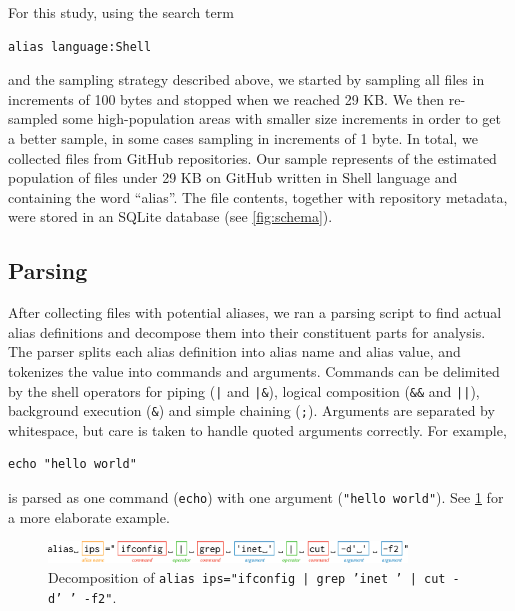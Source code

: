 For this study, using the search term
\begin{verbatim}
alias language:Shell
\end{verbatim}
and the sampling strategy described above, we started by sampling all files in increments of 100 bytes and stopped when we reached 29 KB.
We then re-sampled some high-population areas with smaller size increments in order to get a better sample, in some cases sampling in increments of 1 byte.
In total, we collected  files from  GitHub repositories.
Our sample represents  of the estimated population of  files under 29 KB on GitHub written in Shell language and containing the word ``alias''.
The file contents, together with repository metadata, were stored in an SQLite database (see \cref{fig:schema}).


\subsection{Parsing}

After collecting files with potential aliases, we ran a parsing script to find actual alias definitions and decompose them into their constituent parts for analysis.
The parser splits each alias definition into alias name and alias value, and tokenizes the value into commands and arguments.
Commands can be delimited by the shell operators for piping (\verb!|! and \verb!|&!), logical composition (\verb|&&| and \verb!||!), background execution (\verb|&|) and simple chaining (\verb|;|).
Arguments are separated by whitespace, but care is taken to handle quoted arguments correctly. 
For example, 
\begin{verbatim}
echo "hello world"
\end{verbatim}
is parsed as one command (\texttt{echo}) with one argument (\texttt{"hello world"}).
See \cref{fig:parser} for a more elaborate example.

\begin{figure}
    \centering
    \includegraphics[width=0.85\textwidth]{parser_breakdown.pdf}
    \caption{Decomposition of \texttt{alias ips="ifconfig | grep 'inet ' | cut -d' ' -f2"}.}
    \label{fig:parser}
\end{figure}

